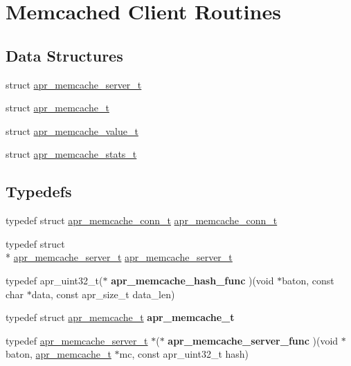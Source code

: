 \hypertarget{group___a_p_r___util___m_c}{\section{Memcached Client Routines}
\label{group___a_p_r___util___m_c}
}
\subsection*{Data Structures}
\begin{DoxyCompactItemize}
\item 
struct \hyperlink{structapr__memcache__server__t}{apr\-\_\-memcache\-\_\-server\-\_\-t}
\item 
struct \hyperlink{structapr__memcache__t}{apr\-\_\-memcache\-\_\-t}
\item 
struct \hyperlink{structapr__memcache__value__t}{apr\-\_\-memcache\-\_\-value\-\_\-t}
\item 
struct \hyperlink{structapr__memcache__stats__t}{apr\-\_\-memcache\-\_\-stats\-\_\-t}
\end{DoxyCompactItemize}
\subsection*{Typedefs}
\begin{DoxyCompactItemize}
\item 
typedef struct \hyperlink{group___a_p_r___util___m_c_gac4fabf6e3b3efb959eca48f473b73825}{apr\-\_\-memcache\-\_\-conn\-\_\-t} \hyperlink{group___a_p_r___util___m_c_gac4fabf6e3b3efb959eca48f473b73825}{apr\-\_\-memcache\-\_\-conn\-\_\-t}
\item 
typedef struct \\*
\hyperlink{structapr__memcache__server__t}{apr\-\_\-memcache\-\_\-server\-\_\-t} \hyperlink{group___a_p_r___util___m_c_gaa7b43f2275de0fc700cc05e2467bbc4b}{apr\-\_\-memcache\-\_\-server\-\_\-t}
\item 
\hypertarget{group___a_p_r___util___m_c_ga27f0376041ada9a7a8efc657b543cd24}{typedef apr\-\_\-uint32\-\_\-t($\ast$ {\bfseries apr\-\_\-memcache\-\_\-hash\-\_\-func} )(void $\ast$baton, const char $\ast$data, const apr\-\_\-size\-\_\-t data\-\_\-len)}\label{group___a_p_r___util___m_c_ga27f0376041ada9a7a8efc657b543cd24}

\item 
\hypertarget{group___a_p_r___util___m_c_ga5bec59e17d9a29de2ffb38afae165371}{typedef struct \hyperlink{structapr__memcache__t}{apr\-\_\-memcache\-\_\-t} {\bfseries apr\-\_\-memcache\-\_\-t}}\label{group___a_p_r___util___m_c_ga5bec59e17d9a29de2ffb38afae165371}

\item 
\hypertarget{group___a_p_r___util___m_c_gae9144ffbb456332c7edbe0dd09759bba}{typedef \hyperlink{structapr__memcache__server__t}{apr\-\_\-memcache\-\_\-server\-\_\-t} $\ast$($\ast$ {\bfseries apr\-\_\-memcache\-\_\-server\-\_\-func} )(void $\ast$baton, \hyperlink{structapr__memcache__t}{apr\-\_\-memcache\-\_\-t} $\ast$mc, const apr\-\_\-uint32\-\_\-t hash)}\label{group___a_p_r___util___m_c_gae9144ffbb456332c7edbe0dd09759bba}

\end{DoxyCompactItemize}
